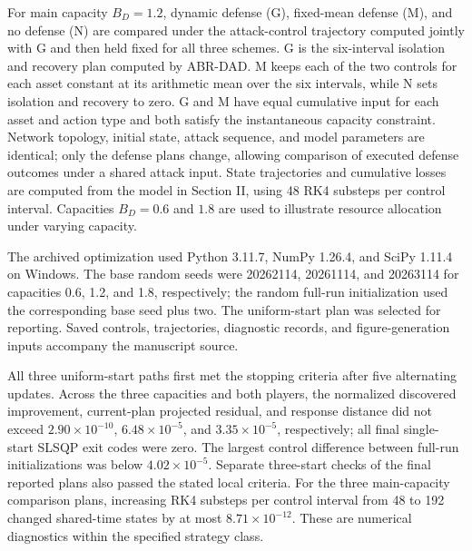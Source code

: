 \documentclass[conference,letterpaper]{IEEEtran}
\begin{document}
For main capacity $B_D=1.2$, dynamic defense (G), fixed-mean defense (M), and no defense (N) are compared under the attack-control trajectory computed jointly with G and then held fixed for all three schemes. G is the six-interval isolation and recovery plan computed by ABR-DAD. M keeps each of the two controls for each asset constant at its arithmetic mean over the six intervals, while N sets isolation and recovery to zero. G and M have equal cumulative input for each asset and action type and both satisfy the instantaneous capacity constraint. Network topology, initial state, attack sequence, and model parameters are identical; only the defense plans change, allowing comparison of executed defense outcomes under a shared attack input. State trajectories and cumulative losses are computed from the model in Section II, using 48 RK4 substeps per control interval. Capacities $B_D=0.6$ and $1.8$ are used to illustrate resource allocation under varying capacity.

The archived optimization used Python 3.11.7, NumPy 1.26.4, and SciPy 1.11.4 on Windows. The base random seeds were 20262114, 20261114, and 20263114 for capacities 0.6, 1.2, and 1.8, respectively; the random full-run initialization used the corresponding base seed plus two. The uniform-start plan was selected for reporting. Saved controls, trajectories, diagnostic records, and figure-generation inputs accompany the manuscript source.

All three uniform-start paths first met the stopping criteria after five alternating updates. Across the three capacities and both players, the normalized discovered improvement, current-plan projected residual, and response distance did not exceed \mbox{$2.90\times10^{-10}$}, \mbox{$6.48\times10^{-5}$}, and \mbox{$3.35\times10^{-5}$}, respectively; all final single-start SLSQP exit codes were zero. The largest control difference between full-run initializations was below \mbox{$4.02\times10^{-5}$}. Separate three-start checks of the final reported plans also passed the stated local criteria. For the three main-capacity comparison plans, increasing RK4 substeps per control interval from 48 to 192 changed shared-time states by at most \mbox{$8.71\times10^{-12}$}. These are numerical diagnostics within the specified strategy class.
\end{document}
